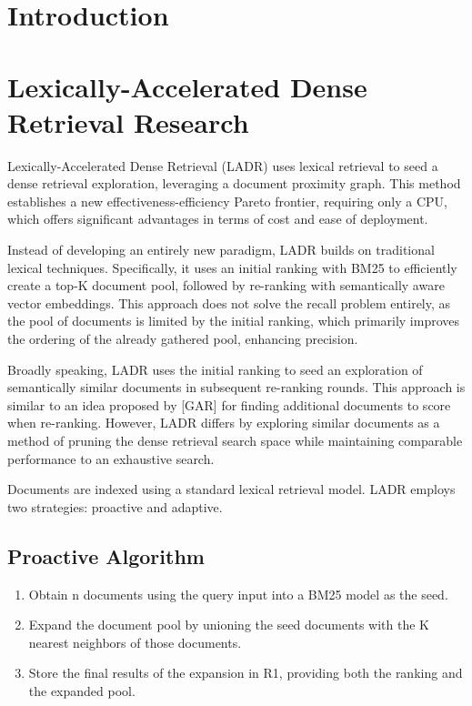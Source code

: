 \documentclass[sigconf,authorversion,nonacm]{acmart}
\begin{document}
\section{Introduction}
\section{Lexically-Accelerated Dense Retrieval Research}

Lexically-Accelerated Dense Retrieval (LADR) uses lexical retrieval to seed a dense retrieval
exploration, leveraging a document proximity graph. This method establishes a new
effectiveness-efficiency Pareto frontier, requiring only a CPU, which offers significant advantages
in terms of cost and ease of deployment.

Instead of developing an entirely new paradigm, LADR builds on traditional lexical techniques.
Specifically, it uses an initial ranking with BM25 to efficiently create a top-K document pool,
followed by re-ranking with semantically aware vector embeddings. This approach does not solve the
recall problem entirely, as the pool of documents is limited by the initial ranking, which primarily
improves the ordering of the already gathered pool, enhancing precision.

Broadly speaking, LADR uses the initial ranking to seed an exploration of semantically similar
documents in subsequent re-ranking rounds. This approach is similar to an idea proposed by [GAR] for
finding additional documents to score when re-ranking. However, LADR differs by exploring similar
documents as a method of pruning the dense retrieval search space while maintaining comparable
performance to an exhaustive search.

Documents are indexed using a standard lexical retrieval model. LADR employs two strategies:
proactive and adaptive.

\subsection{Proactive Algorithm}

\begin{enumerate}
	\item Obtain n documents using the query input into a BM25 model as the seed.
	\item Expand the document pool by unioning the seed documents with the K nearest neighbors of those documents.
	\item Store the final results of the expansion in R1, providing both the ranking and the expanded pool.
\end{enumerate}
\end{document}
